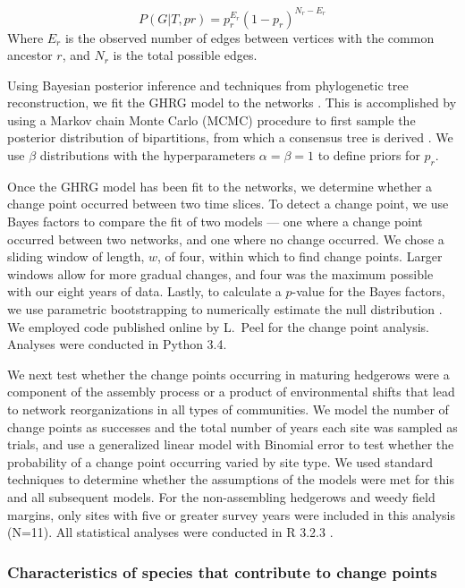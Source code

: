 \documentclass[12pt]{article}
\begin{document}
\begin{equation}
  \label{eq:lik}
  P(G|T,{pr}) = p_r^{E_r}(1-p_r)^{N_r-E_r}
\end{equation}
% 
Where $E_r$ is the observed number of edges between vertices with the
common ancestor $r$, and $N_r$ is the total possible edges.

Using Bayesian posterior inference and techniques from phylogenetic
tree reconstruction, we fit the GHRG model to the networks
\citep{peel2014detecting}. This is accomplished by using a Markov
chain Monte Carlo (MCMC) procedure to first sample the posterior
distribution of bipartitions, from which a consensus tree is derived
\citep{peel2014detecting}. We use $\beta$ distributions with the
hyperparameters $\alpha=\beta=1$ to define priors for $p_r$.

Once the GHRG model has been fit to the networks, we determine whether
a change point occurred between two time slices. To detect a change
point, we use Bayes factors to compare the fit of two models --- one
where a change point occurred between two networks, and one where no
change occurred. We chose a sliding window of length, $w$, of four,
within which to find change points. Larger windows allow for more
gradual changes, and four was the maximum possible with our eight
years of data. Lastly, to calculate a $p$-value for the Bayes factors,
we use parametric bootstrapping to numerically estimate the null
distribution \citep{peel2014detecting}. We employed code published
online by L.~Peel for the change point analysis. Analyses were
conducted in Python 3.4.

We next test whether the change points occurring in maturing hedgerows
were a component of the assembly process or a product of environmental
shifts that lead to network reorganizations in all types of
communities. We model the number of change points as successes and the
total number of years each site was sampled as trials, and use a
generalized linear model with Binomial error to test whether the
probability of a change point occurring varied by site type. We used
standard techniques to determine whether the assumptions of the models
were met for this and all subsequent models. For the non-assembling
hedgerows and weedy field margins, only sites with five or greater
survey years were included in this analysis (N=11). All statistical
analyses were conducted in R 3.2.3 \citep{R}.

\subsubsection*{Characteristics of species that contribute to change
  points}
\end{document}
